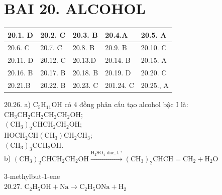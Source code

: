 \documentclass[10pt]{article}
\begin{document}
\section*{BAI 20. ALCOHOL}
\begin{center}
\begin{tabular}{|l|l|l|l|l|}
\hline
20.1. D & 20.2. C & 20.3. B & 20.4.A & 20.5. A \\
\hline
20.6. C & 20.7. C & 20.8. B & 20.9. B & 20.10. C \\
\hline
20.11. D & 20.12. C & 20.13.D & 20.14. B & 20.15. A \\
\hline
20.16. B & 20.17. B & 20.18. B & 20.19. D & 20.20. C \\
\hline
20.21.B & 20.22. B & 20.23. C & 201.24. C & 20.25., A \\
\hline
\end{tabular}
\end{center}

20.26. a) $\mathrm{C}_{5} \mathrm{H}_{11} \mathrm{OH}$ có 4 đồng phân cấu tạo alcohol bậc I là:\\
$\mathrm{CH}_{3} \mathrm{CH}_{2} \mathrm{CH}_{2} \mathrm{CH}_{2} \mathrm{CH}_{2} \mathrm{OH}$;\\
$\left(\mathrm{CH}_{3}\right)_{2} \mathrm{CHCH}_{2} \mathrm{CH}_{2} \mathrm{OH} ;$\\
$\mathrm{HOCH}_{2} \mathrm{CH}\left(\mathrm{CH}_{3}\right) \mathrm{CH}_{2} \mathrm{CH}_{3}$;\\
$\left(\mathrm{CH}_{3}\right)_{3} \mathrm{CCH}_{2} \mathrm{OH}$.\\
b) $\left(\mathrm{CH}_{3}\right)_{2} \mathrm{CHCH}_{2} \mathrm{CH}_{2} \mathrm{OH} \xrightarrow{\mathrm{H}_{2} \mathrm{SO}_{4} \text { dạc, t }{ }^{\circ}}\left(\mathrm{CH}_{3}\right)_{2} \mathrm{CHCH}=\mathrm{CH}_{2}+\mathrm{H}_{2} \mathrm{O}$

3-methylbut-1-ene\\
20.27. $\mathrm{C}_{2} \mathrm{H}_{5} \mathrm{OH}+\mathrm{Na} \longrightarrow \mathrm{C}_{2} \mathrm{H}_{5} \mathrm{ONa}+\mathrm{H}_{2}$
\end{document}

